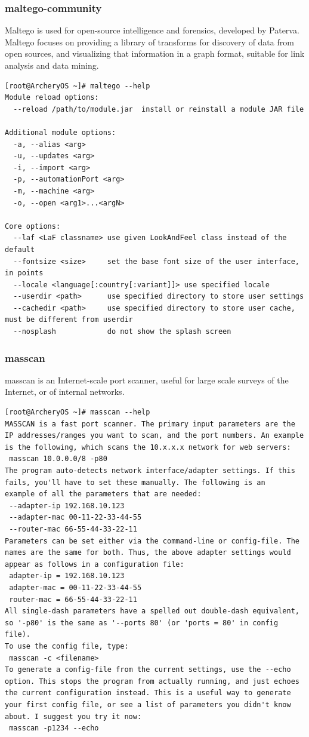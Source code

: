 \documentclass{article}
\begin{document}
\subsubsection{maltego-community}
Maltego is used for open-source intelligence and forensics, developed by Paterva. Maltego focuses on providing a library of transforms for discovery of data from open sources, and visualizing that information in a graph format, suitable for link analysis and data mining.
\begin{lstlisting}
[root@ArcheryOS ~]# maltego --help
Module reload options:
  --reload /path/to/module.jar  install or reinstall a module JAR file

Additional module options:
  -a, --alias <arg>
  -u, --updates <arg>
  -i, --import <arg>
  -p, --automationPort <arg>
  -m, --machine <arg>
  -o, --open <arg1>...<argN>

Core options:
  --laf <LaF classname> use given LookAndFeel class instead of the default
  --fontsize <size>     set the base font size of the user interface, in points
  --locale <language[:country[:variant]]> use specified locale
  --userdir <path>      use specified directory to store user settings
  --cachedir <path>     use specified directory to store user cache, must be different from userdir
  --nosplash            do not show the splash screen
\end{lstlisting}

\subsubsection{masscan}
masscan  is an Internet-scale port scanner, useful for large scale surveys of the Internet, or of internal networks.
\begin{lstlisting}
[root@ArcheryOS ~]# masscan --help
MASSCAN is a fast port scanner. The primary input parameters are the
IP addresses/ranges you want to scan, and the port numbers. An example
is the following, which scans the 10.x.x.x network for web servers:
 masscan 10.0.0.0/8 -p80
The program auto-detects network interface/adapter settings. If this
fails, you'll have to set these manually. The following is an
example of all the parameters that are needed:
 --adapter-ip 192.168.10.123
 --adapter-mac 00-11-22-33-44-55
 --router-mac 66-55-44-33-22-11
Parameters can be set either via the command-line or config-file. The
names are the same for both. Thus, the above adapter settings would
appear as follows in a configuration file:
 adapter-ip = 192.168.10.123
 adapter-mac = 00-11-22-33-44-55
 router-mac = 66-55-44-33-22-11
All single-dash parameters have a spelled out double-dash equivalent,
so '-p80' is the same as '--ports 80' (or 'ports = 80' in config file).
To use the config file, type:
 masscan -c <filename>
To generate a config-file from the current settings, use the --echo
option. This stops the program from actually running, and just echoes
the current configuration instead. This is a useful way to generate
your first config file, or see a list of parameters you didn't know
about. I suggest you try it now:
 masscan -p1234 --echo
\end{lstlisting}
\end{document}
